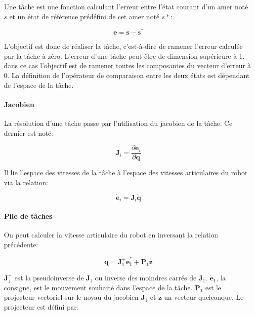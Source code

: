 \begin{mydef}
Une tâche est une fonction calculant l'erreur entre l'état courant
d'un amer noté $s$ et un état de référence prédéfini de cet amer
noté $s*$:

\begin{equation}
  \mathbf{e} = \mathbf{s} - \mathbf{s}^{*}
\end{equation}

L'objectif est donc de réaliser la tâche, c'est-à-dire de ramener
l'erreur calculée par la tâche à zéro. L'erreur d'une tâche peut être
de dimension supérieure à 1, dans ce cas l'objectif est de ramener
toutes les composantes du vecteur d'erreur à $0$. La définition de
l'opérateur de comparaison entre les deux états est dépendant de
l'espace de la tâche.
\end{mydef}

\paragraph{Jacobien}

La résolution d'une tâche passe par l'utilisation du jacobien de la
tâche. Ce dernier est noté:

\begin{equation}
  \mathbf{J}_i = \frac{\partial \mathbf{e}_i}{\partial \mathbf{q}}
\end{equation}

Il lie l'espace des vitesses de la tâche à l'espace des vitesses
articulaires du robot via la relation:

\begin{equation}
  \dot{\mathbf{e}}_i = \mathbf{J}_i \dot{\mathbf{q}}
\end{equation}


\paragraph{Pile de tâches}

On peut calculer la vitesse articulaire du robot en inversant la
relation précédente:

\begin{equation}
  \dot{\mathbf{q}} = \mathbf{J}_1^{+} \dot{\mathbf{e}}_1^{*} + \mathbf{P}_1 \mathbf{z}
\end{equation}

$\mathbf{J}_1^{+}$ est la pseudoinverse de $\mathbf{J}_1$ ou inverse
des moindres carrés de $\mathbf{J}_1$. $\dot{\mathbf{e}}_1$, la
consigne, est le mouvement souhaité dans l'espace de la
tâche. $\mathbf{P}_1$ est le projecteur vectoriel sur le noyau du
jacobien $\mathbf{J}_1$ et $\mathbf{z}$ un vecteur quelconque. Le
projecteur est défini par:

